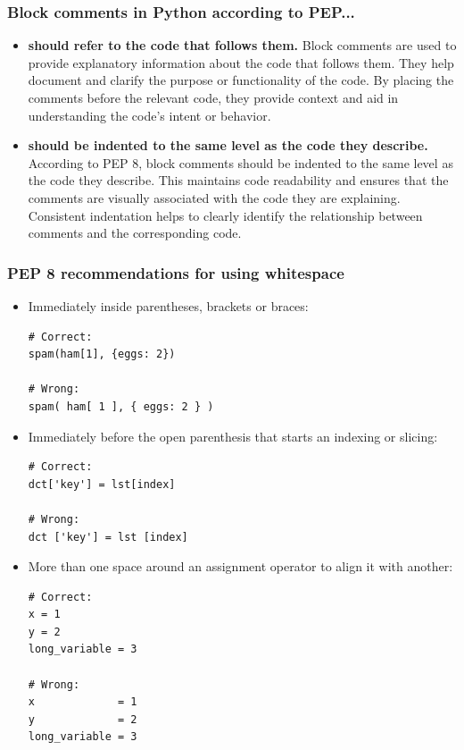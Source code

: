 \subsubsection{Block comments in Python according to PEP...}
\begin{itemize}
\item \textbf{should refer to the code that follows them.} Block comments are used to provide explanatory information about the code that follows them. They help document and clarify the purpose or functionality of the code. By placing the comments before the relevant code, they provide context and aid in understanding the code's intent or behavior.

\item \textbf{should be indented to the same level as the code they describe.} According to PEP 8, block comments should be indented to the same level as the code they describe. This maintains code readability and ensures that the comments are visually associated with the code they are explaining. Consistent indentation helps to clearly identify the relationship between comments and the corresponding code.

\end{itemize}

\subsubsection{PEP 8 recommendations for using whitespace}

\begin{itemize}
\item Immediately inside parentheses, brackets or braces:
\begin{codebox}
\begin{verbatim}
# Correct:
spam(ham[1], {eggs: 2})

# Wrong:
spam( ham[ 1 ], { eggs: 2 } )
\end{verbatim}
\end{codebox}

\item Immediately before the open parenthesis that starts an indexing or slicing:
\begin{codebox}
\begin{verbatim}
# Correct:
dct['key'] = lst[index]

# Wrong:
dct ['key'] = lst [index]
\end{verbatim}
\end{codebox}

\item More than one space around an assignment operator to align it with another:
\begin{codebox}
\begin{verbatim}
# Correct:
x = 1
y = 2
long_variable = 3

# Wrong:
x             = 1
y             = 2
long_variable = 3
\end{verbatim}
\end{codebox}
\end{itemize}



